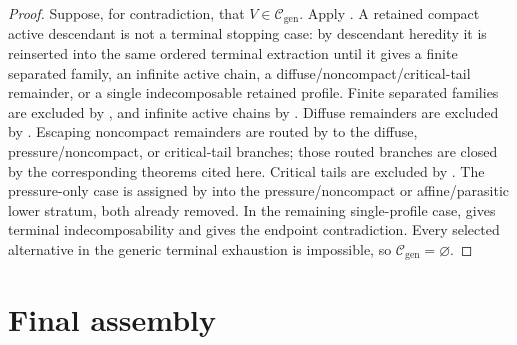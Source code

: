 \documentclass[11pt]{amsart}
\numberwithin{equation}{section}
\theoremstyle{plain}
\theoremstyle{definition}
\theoremstyle{remark}
\newcommand{\Cgen}{\mathcal C_{\mathrm{gen}}}
\begin{document}
\begin{proof}
Suppose, for contradiction, that \(V\in\Cgen\).  Apply
.  A retained compact active descendant is
not a terminal stopping case: by descendant heredity it is reinserted into the
same ordered terminal extraction until it gives a finite separated family, an
infinite active chain, a diffuse/noncompact/critical-tail remainder, or a single
indecomposable retained profile.  Finite separated families are excluded by
, and infinite active chains by
.  Diffuse remainders are excluded by
.  Escaping
noncompact remainders are routed by
to the diffuse, pressure/noncompact, or critical-tail branches; those routed
branches are closed by the corresponding theorems cited here.  Critical
tails are excluded by
.
The pressure-only case is assigned by
 into the pressure/noncompact or
affine/parasitic lower stratum, both already removed.  In the remaining
single-profile case,  gives terminal
indecomposability and  gives the endpoint
contradiction.  Every selected alternative in the generic terminal exhaustion is
impossible, so \(\Cgen=\varnothing\).
\end{proof}

\section{Final assembly}
\label{sec:final-assembly}
\end{document}
